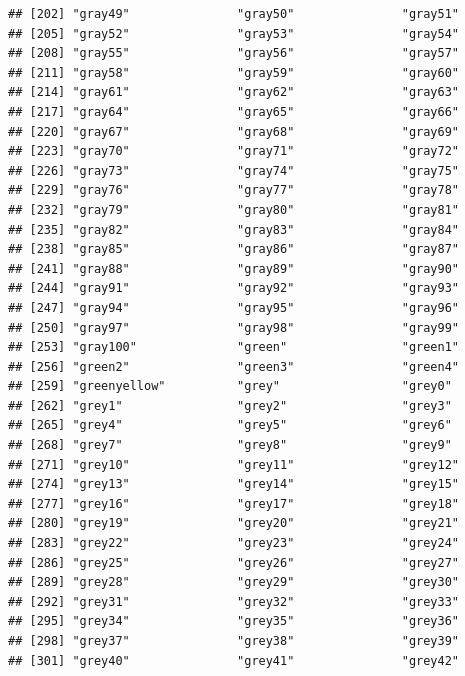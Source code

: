 \documentclass[
]{article}
\begin{document}
\begin{verbatim}
## [202] "gray49"               "gray50"               "gray51"              
## [205] "gray52"               "gray53"               "gray54"              
## [208] "gray55"               "gray56"               "gray57"              
## [211] "gray58"               "gray59"               "gray60"              
## [214] "gray61"               "gray62"               "gray63"              
## [217] "gray64"               "gray65"               "gray66"              
## [220] "gray67"               "gray68"               "gray69"              
## [223] "gray70"               "gray71"               "gray72"              
## [226] "gray73"               "gray74"               "gray75"              
## [229] "gray76"               "gray77"               "gray78"              
## [232] "gray79"               "gray80"               "gray81"              
## [235] "gray82"               "gray83"               "gray84"              
## [238] "gray85"               "gray86"               "gray87"              
## [241] "gray88"               "gray89"               "gray90"              
## [244] "gray91"               "gray92"               "gray93"              
## [247] "gray94"               "gray95"               "gray96"              
## [250] "gray97"               "gray98"               "gray99"              
## [253] "gray100"              "green"                "green1"              
## [256] "green2"               "green3"               "green4"              
## [259] "greenyellow"          "grey"                 "grey0"               
## [262] "grey1"                "grey2"                "grey3"               
## [265] "grey4"                "grey5"                "grey6"               
## [268] "grey7"                "grey8"                "grey9"               
## [271] "grey10"               "grey11"               "grey12"              
## [274] "grey13"               "grey14"               "grey15"              
## [277] "grey16"               "grey17"               "grey18"              
## [280] "grey19"               "grey20"               "grey21"              
## [283] "grey22"               "grey23"               "grey24"              
## [286] "grey25"               "grey26"               "grey27"              
## [289] "grey28"               "grey29"               "grey30"              
## [292] "grey31"               "grey32"               "grey33"              
## [295] "grey34"               "grey35"               "grey36"              
## [298] "grey37"               "grey38"               "grey39"              
## [301] "grey40"               "grey41"               "grey42"              

\end{verbatim}
\end{document}
